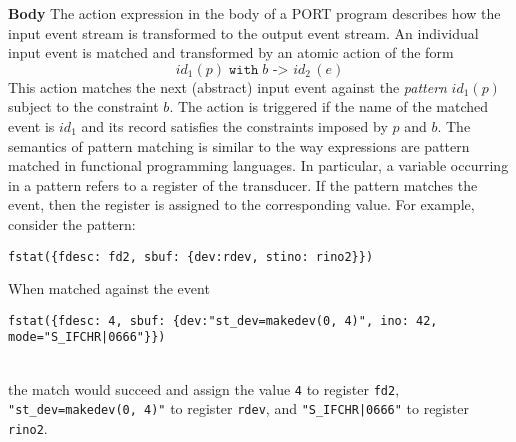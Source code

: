 %
%



\noindent\textbf{Body} The action expression in the body of a PORT program describes how the input event stream is transformed to the output event stream. An individual input event is matched and transformed by an atomic action of the form
\[\mathit{id}_1(p) \;\mathtt{with}\; b \texttt{ -> } \mathit{id}_2\,(e)\]
This action matches the next (abstract) input event against the \emph{pattern} $\mathit{id}_1(p)$ subject to the constraint $b$. The action is triggered if the name of the matched event is $\mathit{id}_1$ and its record satisfies the constraints imposed by $p$ and $b$. The semantics of pattern matching is similar to the way expressions are pattern matched in functional programming languages. In particular, a variable occurring in a pattern refers to a register of the transducer. If the pattern matches the event, then the register is assigned to the corresponding value. For example, consider the pattern:
\begin{lstlisting}[numbers=none,xleftmargin=0em,gobble=2]
  fstat({fdesc: fd2, sbuf: {dev:rdev, stino: rino2}})
\end{lstlisting}
When matched against the event\\[.3em]
\begin{adjustbox}{max width=\textwidth}
\begin{lstlisting}[numbers=none,xleftmargin=0em,gobble=2]
  fstat({fdesc: 4, sbuf: {dev:"st_dev=makedev(0, 4)", ino: 42, mode="S_IFCHR|0666"}})
\end{lstlisting}
\end{adjustbox}\\[.5em]
the match would succeed and assign the value \lstinline+4+ to register \lstinline+fd2+, \lstinline+"st_dev=makedev(0, 4)"+ to register \lstinline+rdev+, and \lstinline+"S_IFCHR|0666"+ to register \lstinline+rino2+.


